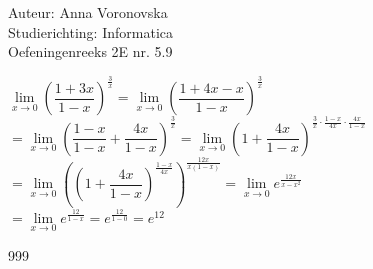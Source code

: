 \documentclass[a4paper]{article}
\begin{document}
  
\noindent \large Auteur: Anna Voronovska \\
\noindent \large Studierichting: Informatica\\
\noindent \large Oefeningenreeks 2E nr. 5.9\\

\medskip

\normalsize

$\lim\limits_{x \to 0} \left(\dfrac{1+3x}{1-x}\right)^{\tfrac{3}{x}} = \lim\limits_{x \to 0} \left(\dfrac{1+4x-x}{1-x}\right)^{\tfrac{3}{x}}$ \\

$= \lim\limits_{x \to 0} \left(\dfrac{1-x}{1-x} + \dfrac{4x}{1-x}\right)^{\tfrac{3}{x}} = \lim\limits_{x \to 0} \left(1 + \dfrac{4x}{1-x}\right)^{\tfrac{3}{x} \cdot \tfrac{1-x}{4x} \cdot \tfrac{4x}{1-x}} $ \\

$= \lim\limits_{x \to 0} \left(\left(1 + \dfrac{4x}{1-x}\right)^{\tfrac{1-x}{4x}}\right)^{\tfrac{12x}{x(1-x)}} = \lim\limits_{x \to 0} e^{\tfrac{12x}{x-x^2}} $ \\

$= \lim\limits_{x \to 0} e^{\tfrac{12}{1-x}} = e^{\tfrac{12}{1-0}} = e^{12}$

\begin{thebibliography}{999}
\end{thebibliography}
\end{document}
